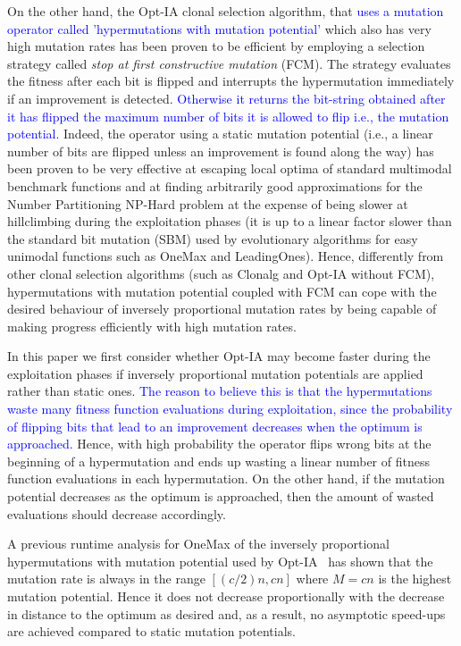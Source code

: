 \documentclass[lettersize,journal]{IEEEtran}
\newcommand{\new}[1]{\textcolor{blue}{#1}}
\begin{document}
On the other hand, the Opt-IA clonal selection algorithm, that \new{uses a mutation operator called 'hypermutations with mutation potential'} which also has very high mutation rates has been proven to be efficient by employing a selection strategy called {\it stop at first constructive mutation} (FCM). The strategy evaluates the fitness after each bit is flipped and interrupts the hypermutation immediately if an improvement is detected. \new {Otherwise it returns the bit-string obtained after it has flipped the maximum number of  bits it is allowed to flip i.e., the mutation potential.} 
Indeed, the operator using a static mutation potential (i.e., a linear number of bits are flipped unless an improvement is found along the way) has been proven to be very effective at escaping local
optima of standard multimodal benchmark functions \cite{CorusOlivetoYazdaniGECCO2017} and at finding arbitrarily good approximations for the Number Partitioning NP-Hard problem \cite{CorusOlivetoYazdaniPPSN2018Approx,CorusOlivetoYazdaniAIJ2019} at the expense
of being slower at hillclimbing during the exploitation phases (it is up to a linear factor slower than the standard bit mutation (SBM) used by evolutionary algorithms for easy unimodal functions such as OneMax and LeadingOnes).
Hence, differently from other clonal selection algorithms (such as Clonalg and Opt-IA without FCM), hypermutations with mutation potential coupled with FCM can cope with the desired behaviour of inversely proportional mutation rates by being capable of making progress efficiently with high mutation rates. %

In this paper we first consider whether Opt-IA may become faster during the exploitation phases if inversely proportional mutation potentials are applied rather than static ones.
\new{The reason to believe this is that the hypermutations waste many fitness function evaluations during exploitation, since the probability of flipping bits that lead to an improvement decreases when the optimum is approached.} 
Hence, with high probability the operator flips wrong bits at the beginning of a hypermutation and ends up wasting a linear number
of fitness function evaluations in each hypermutation. On the other hand, if the mutation potential decreases as the optimum is approached, 
then the amount of wasted evaluations should decrease accordingly.

A previous runtime analysis for OneMax of the inversely proportional hypermutations with mutation potential used by Opt-IA~\cite{JansenZarges2011} has shown that the mutation rate is always in the range $[(c/2)n, cn]$ where $M=cn$ is the highest mutation potential. Hence it does not decrease proportionally with the decrease in distance to the optimum as desired and, as a result, no asymptotic speed-ups are achieved compared to static mutation potentials. 
\end{document}
